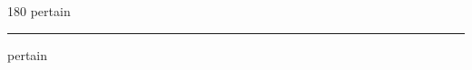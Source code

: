 
\begin{frame}
\begin{center}
\begin{turn}{180}
{\fontsize{2.5cm}{1em}\selectfont pertain}
\end{turn}
\vspace{1em}\par  
\hrule
\vspace{1em}\par  
{\fontsize{2.5cm}{1em}\selectfont pertain}
\end{center}
\end{frame}
